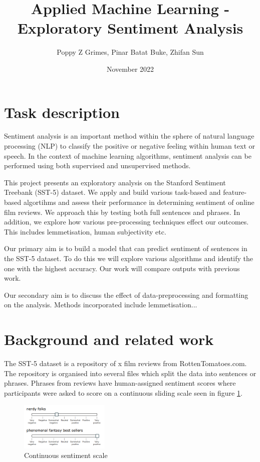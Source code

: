 \documentclass[11pt, a4paper]{article}
\title{Applied Machine Learning - Exploratory Sentiment Analysis}
\author{Poppy Z Grimes, Pinar Batat Buke, Zhifan Sun}
\date{November 2022}
\begin{document}
\maketitle 

\section{Task description}

Sentiment analysis is an important method within the sphere of natural language processing (NLP) to classify the positive or negative feeling within human text or speech. In the context of machine learning algorithms, sentiment analysis can be performed using both supervised and unsupervised methods. 

This project presents an exploratory analysis on the Stanford Sentiment Treebank (SST-5) dataset. We apply and build various task-based and feature-based algortihms and assess their performance in determining sentiment of online film reviews. We approach this by testing both full sentences and phrases. In addition, we explore how various pre-processing techniques effect our outcomes. This includes lemmetisation, human subjectivity etc.

Our primary aim is to build a model that can predict sentiment of sentences in the SST-5 dataset. To do this we will explore various algorithms and identify the one with the highest accuracy. Our work will compare outputs with previous work.

Our secondary aim is to discuss the effect of data-preprocessing and formatting on the analysis. Methods incorporated include lemmetisation...


\section{Background and related work}
The SST-5 dataset is a repository of x film reviews from RottenTomatoes.com. The repository is organised into several files which split the data into sentences or phrases. Phrases from reviews have human-assigned sentiment scores where participants were asked to score on a continuous sliding scale seen in figure \ref{fig:sentiment_scale}.

\begin{figure}
    \begin{center}
        \includegraphics[width=0.38\textwidth]{sentiment_scale} 
    \end{center}
\caption{Continuous sentiment scale}
\label{fig:sentiment_scale}
\end{figure}
\end{document}
